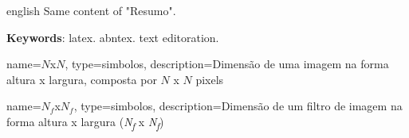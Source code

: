\begin{resumo}[Abstract]
 \begin{otherlanguage*}{english}
   Same content of "Resumo".

   \vspace{\onelineskip}

   \noindent
   \textbf{Keywords}: latex. abntex. text editoration.
 \end{otherlanguage*}
\end{resumo}

%
%
%

\listoffigures*
\cleardoublepage

\listofquadros*
\cleardoublepage

\listoftables*
\cleardoublepage


\printglossary[type=\acronymtype,title={Lista de abreviaturas e siglas}]
\cleardoublepage

%

{%
	name=$N$x$N$,
	type=simbolos,
	description={Dimensão de uma imagem na forma altura x largura, composta por $N$ x $N$ pixels}
}

{%
	name=$N_{f}$x$N_{f}$,
	type=simbolos,
	description={Dimensão de um filtro de imagem na forma altura x largura (\textit{N\textsubscript{f}} x \textit{N\textsubscript{f}})}
}

